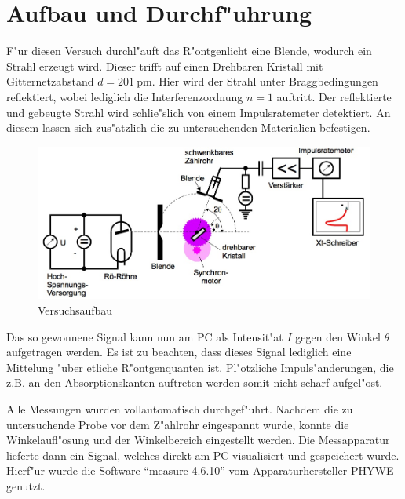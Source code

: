 \section{Aufbau und Durchf"uhrung}
	\label{sec:durchfuehrung}
	F"ur diesen Versuch durchl"auft das R"ontgenlicht eine Blende, wodurch ein Strahl erzeugt wird.
	Dieser trifft auf einen Drehbaren Kristall mit Gitternetzabstand $d = \SI{201}{\pico \meter}$.
	Hier wird der Strahl unter Braggbedingungen reflektiert, wobei lediglich die In\-ter\-fe\-renz\-ord\-nung $n = 1$ auftritt.
	Der reflektierte und gebeugte Strahl wird schlie"slich von einem Im\-puls\-ra\-te\-me\-ter detektiert.
	An diesem lassen sich zus"atzlich die zu untersuchenden Materialien befestigen.
	
	\begin{figure}[h]
		\centering
		\includegraphics[width = 15cm]{img/aufbau.JPG}
		\caption{Versuchsaufbau \cite{anleitung}}
		\label{fig:aufbau}
	\end{figure}
	
	Das so gewonnene Signal kann nun am PC als Intensit"at $I$ gegen den Winkel $\theta$ aufgetragen werden.
	Es ist zu beachten, dass dieses Signal lediglich eine Mittelung "uber etliche R"ontgenquanten ist.
	Pl"otzliche Impuls"anderungen, die z.B. an den Absorptionskanten auftreten werden somit nicht scharf aufgel"ost.

	Alle Messungen wurden vollautomatisch durchgef"uhrt.
	Nachdem die zu untersuchende Probe vor dem Z"ahlrohr eingespannt wurde, konnte die Winkelaufl"osung und der Win\-kel\-be\-reich eingestellt werden.
	Die Messapparatur lieferte dann ein Signal, welches direkt am PC visualisiert und gespeichert wurde.
	Hierf"ur wurde die Software "`measure 4.6.10"' vom Apparaturhersteller PHYWE genutzt.

